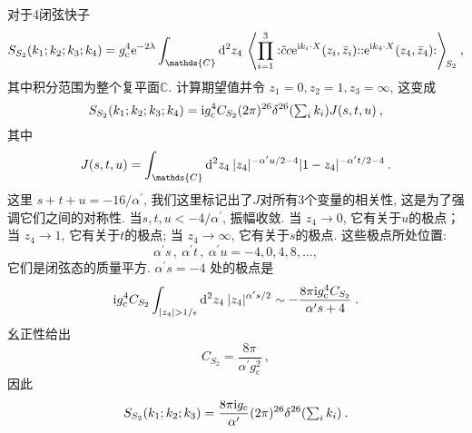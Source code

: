对于4闭弦快子
\begin{equation}
	S_{S_{2}}(k_{1} ; k_{2} ; k_{3} ; k_{4})=g_{\mathrm{c}}^{4} \me^{-2 \lambda} 
	\int_{\mathds{C}} \dif^{2} z_{4} \: \left\langle\prod_{i=1}^{3}
	: \mathrel{\tilde{c} c \me^{\mi k_{i} \cdot X}(z_{i}, \bar{z}_{i})}:
	: \mathrel{\me^{\mi k_{4} \cdot X}(z_{4}, \bar{z}_{4})}:\right\rangle\bigg._{\!\!S_{2}} \:, \label{6.6.3}
\end{equation}
其中积分范围为整个复平面$\mathds{C}$. 计算期望值并令 $z_{1}=0, z_{2}=1, z_{3}=\infty$, 这变成
\begin{equation}
	S_{S_{2}}(k_{1} ; k_{2} ; k_{3} ; k_{4}) = 
	\mathrm{i} g_{\mathrm{c}}^{4} C_{S_{2}}(2 \pi)^{26} \delta^{26}({\textstyle\sum_{i} k_{i}}) J(s, t, u) \:, \label{6.6.4}
\end{equation}
其中
\begin{equation}
	J(s, t, u)=\int_{\mathds{C}} \dif^{2} z_{4}\: |z_{4}|^{-\alpha^{\prime} u / 2-4}|1-z_{4}|^{-\alpha^{\prime} t/2-4}\:. \label{6.6.5}
\end{equation}
这里 $s+t+u=-16 / \alpha^{\prime}$, 我们这里标记出了$J$对所有3个变量的相关性, 这是为了强调它们之间的对称性. 
当$s, t, u<-4 / \alpha^{\prime}$, 振幅收敛. 当 $z_{4} \rightarrow 0$, 它有关于$u$的极点；当 $z_{4} \rightarrow 1$, 它有关于$t$的极点; 
当 $z_{4} \rightarrow \infty$, 它有关于$s$的极点. 这些极点所处位置: 
\begin{equation}
	\alpha^{\prime} s\,,\: \alpha^{\prime} t \,,\: \alpha^{\prime} u=-4,0,4,8, \ldots,\label{6.6.6}
\end{equation}
它们是闭弦态的质量平方. $\alpha^{\prime} s=-4$ 处的极点是
\begin{equation}
	\mi g_{\mathrm{c}}^{4} C_{S_{2}} \int_{|z_{4}|>1 / \epsilon} \dif^{2} z_{4}\: |z_{4}|^{\alpha^{\prime} s / 2} 
	\sim-\frac{8 \pi \mi g_{\mathrm{c}}^{4} C_{S_{2}}}{\alpha^{\prime} s+4} \:. \label{6.6.7}
\end{equation}
幺正性给出
\begin{equation}
	C_{S_{2}}=\frac{8 \pi}{\alpha^{\prime} g_{\mathrm{c}}^{2}} \:, \label{6.6.8}
\end{equation}
因此
\begin{equation}
	S_{S_{2}}(k_{1} ; k_{2} ; k_{3})=\frac{8 \pi \mathrm{i} g_{\mathrm{c}}}{\alpha^{\prime}}(2 \pi)^{26} 
	\delta^{26}({\textstyle\sum_{i} k_{i}}) \:. \label{6.6.9}
\end{equation}

